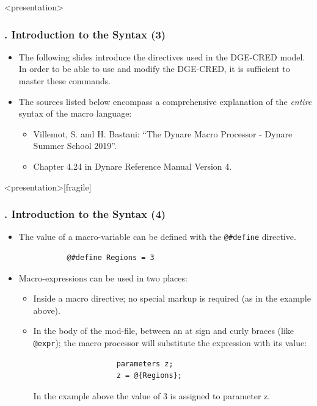 \documentclass[11pt,aspectratio=169]{beamer}
\begin{document}
\begin{frame}<presentation>
	\frametitle{{\thesection.\thesubsection\thinspace\thesubsubsection} Introduction to the Syntax (3)}
	\begin{itemize}
		\item The following slides introduce the directives used in the DGE-CRED model. In order to be able to use and modify the DGE-CRED, it is sufficient to master these commands. 
		\item The sources listed below encompass a comprehensive explanation of the \textit{entire} syntax of the macro language:
		\begin{itemize}
			\item Villemot, S. and H. Bastani: ``The Dynare Macro Processor - Dynare Summer School 2019''.
			\item Chapter 4.24 in Dynare Reference Manual Version 4.
		\end{itemize}
	\end{itemize}
\end{frame}
\begin{frame}<presentation>[fragile]
	\frametitle{{\thesection.\thesubsection\thinspace\thesubsubsection} Introduction to the Syntax (4)}
	\begin{itemize}
		\item The value of a macro-variable can be defined with the \texttt{@\#define} directive.
		\begin{verbatim}
		   @#define Regions = 3
		\end{verbatim}
		\item Macro-expressions can be used in two places:
		\begin{itemize}
			\item Inside a macro directive; no special markup is required (as in the example above).
			\item In the body of the mod-file, between an at sign and curly braces (like \texttt{@{expr}}); the macro processor will substitute the expression with its value:
				\begin{verbatim}
				   parameters z;
				   z = @{Regions};
				\end{verbatim}
			In the example above the value of 3 is assigned to parameter z.
		\end{itemize}
	\end{itemize}
\end{frame}
\end{document}
